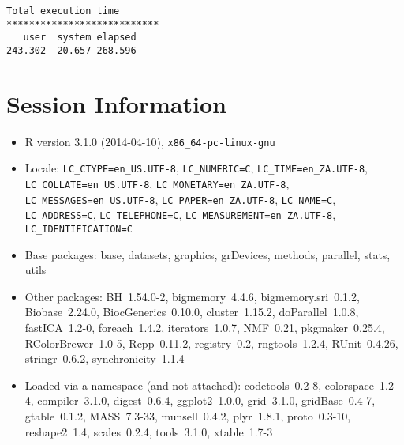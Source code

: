 \documentclass[10pt]{article}\usepackage[]{graphicx}\usepackage[]{color}
\begin{document}
\begin{verbatim}
Total execution time
***************************
   user  system elapsed 
243.302  20.657 268.596 

\end{verbatim}

\section*{Session Information}
\begin{itemize}\raggedright
  \item R version 3.1.0 (2014-04-10), \verb|x86_64-pc-linux-gnu|
  \item Locale: \verb|LC_CTYPE=en_US.UTF-8|, \verb|LC_NUMERIC=C|, \verb|LC_TIME=en_ZA.UTF-8|, \verb|LC_COLLATE=en_US.UTF-8|, \verb|LC_MONETARY=en_ZA.UTF-8|, \verb|LC_MESSAGES=en_US.UTF-8|, \verb|LC_PAPER=en_ZA.UTF-8|, \verb|LC_NAME=C|, \verb|LC_ADDRESS=C|, \verb|LC_TELEPHONE=C|, \verb|LC_MEASUREMENT=en_ZA.UTF-8|, \verb|LC_IDENTIFICATION=C|
  \item Base packages: base, datasets, graphics, grDevices, methods,
    parallel, stats, utils
  \item Other packages: BH~1.54.0-2, bigmemory~4.4.6,
    bigmemory.sri~0.1.2, Biobase~2.24.0, BiocGenerics~0.10.0,
    cluster~1.15.2, doParallel~1.0.8, fastICA~1.2-0, foreach~1.4.2,
    iterators~1.0.7, NMF~0.21, pkgmaker~0.25.4, RColorBrewer~1.0-5,
    Rcpp~0.11.2, registry~0.2, rngtools~1.2.4, RUnit~0.4.26,
    stringr~0.6.2, synchronicity~1.1.4
  \item Loaded via a namespace (and not attached): codetools~0.2-8,
    colorspace~1.2-4, compiler~3.1.0, digest~0.6.4, ggplot2~1.0.0,
    grid~3.1.0, gridBase~0.4-7, gtable~0.1.2, MASS~7.3-33,
    munsell~0.4.2, plyr~1.8.1, proto~0.3-10, reshape2~1.4,
    scales~0.2.4, tools~3.1.0, xtable~1.7-3
\end{itemize}
\end{document}
